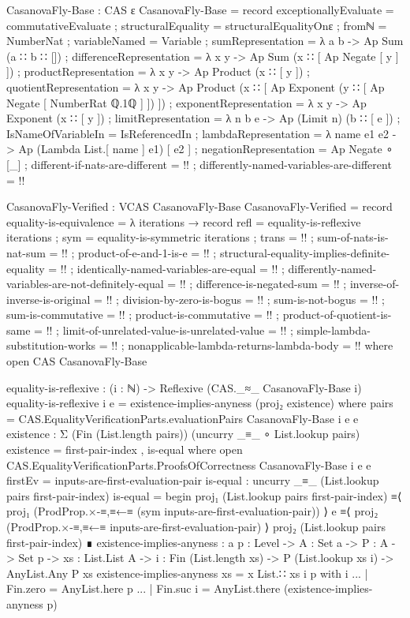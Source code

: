 \documentclass{report}
\begin{document}
\begin{code}
CasanovaFly-Base : CAS ε
CasanovaFly-Base = record
  { exceptionallyEvaluate = commutativeEvaluate
  ; structuralEquality = structuralEqualityOnε
  ; fromℕ = NumberNat
  ; variableNamed = Variable
  ; sumRepresentation = λ a b -> Ap Sum (a ∷ b ∷ [])
  ; differenceRepresentation = λ x y -> Ap Sum (x ∷ [ Ap Negate [ y ] ])
  ; productRepresentation = λ x y -> Ap Product (x ∷ [ y ])
  ; quotientRepresentation = λ x y ->
     Ap Product (x ∷ [ Ap Exponent (y ∷ [ Ap Negate [ NumberRat ℚ.1ℚ ] ]) ])
  ; exponentRepresentation = λ x y -> Ap Exponent (x ∷ [ y ])
  ; limitRepresentation = λ n b e -> Ap (Limit n) (b ∷ [ e ])
  ; IsNameOfVariableIn = IsReferencedIn
  ; lambdaRepresentation = λ name e1 e2 -> Ap (Lambda List.[ name ] e1) [ e2 ]
  ; negationRepresentation = Ap Negate ∘ [_]
  ; different-if-nats-are-different = {!!}
  ; differently-named-variables-are-different = {!!}
  }

CasanovaFly-Verified : VCAS CasanovaFly-Base
CasanovaFly-Verified = record
  { equality-is-equivalence = λ iterations → record
    { refl = equality-is-reflexive iterations
    ; sym = equality-is-symmetric iterations
    ; trans = {!!}
    }
  ; sum-of-nats-is-nat-sum = {!!}
  ; product-of-e-and-1-is-e = {!!}
  ; structural-equality-implies-definite-equality = {!!}
  ; identically-named-variables-are-equal = {!!}
  ; differently-named-variables-are-not-definitely-equal = {!!}
  ; difference-is-negated-sum = {!!}
  ; inverse-of-inverse-is-original = {!!}
  ; division-by-zero-is-bogus = {!!}
  ; sum-is-not-bogus = {!!}
  ; sum-is-commutative = {!!}
  ; product-is-commutative = {!!}
  ; product-of-quotient-is-same = {!!}
  ; limit-of-unrelated-value-is-unrelated-value = {!!}
  ; simple-lambda-substitution-works = {!!}
  ; nonapplicable-lambda-returns-lambda-body = {!!}
  }
  where
  open CAS CasanovaFly-Base

  equality-is-reflexive : (i : ℕ) -> Reflexive (CAS._≈_ CasanovaFly-Base i)
  equality-is-reflexive i {e} = existence-implies-anyness (proj₂ existence)
    where
    pairs = CAS.EqualityVerificationParts.evaluationPairs CasanovaFly-Base i e e
    existence : Σ (Fin (List.length pairs)) (uncurry _≡_ ∘ List.lookup pairs)
    existence = first-pair-index , is-equal
      where
      open CAS.EqualityVerificationParts.ProofsOfCorrectness CasanovaFly-Base i e e
      firstEv = inputs-are-first-evaluation-pair
      is-equal : uncurry _≡_ (List.lookup pairs first-pair-index)
      is-equal = begin
        proj₁ (List.lookup pairs first-pair-index)
          ≡⟨ proj₁ (ProdProp.×-≡,≡←≡ (sym inputs-are-first-evaluation-pair)) ⟩
        e
          ≡⟨ proj₂ (ProdProp.×-≡,≡←≡ inputs-are-first-evaluation-pair) ⟩
        proj₂ (List.lookup pairs first-pair-index) ∎
    existence-implies-anyness :
      {a p : Level} ->
      {A : Set a} ->
      {P : A -> Set p} ->
      {xs : List.List A} ->
      {i : Fin (List.length xs)} ->
      P (List.lookup xs i) ->
      AnyList.Any P xs
    existence-implies-anyness {xs = x List.∷ xs} {i} p with i
    ... | Fin.zero = AnyList.here p
    ... | Fin.suc i = AnyList.there (existence-implies-anyness p)


\end{code}
\end{document}

